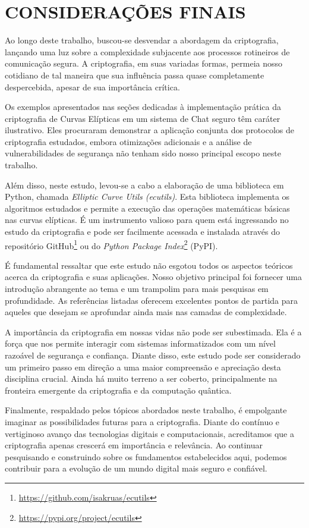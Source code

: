 \section{CONSIDERAÇÕES FINAIS}
Ao longo deste trabalho, buscou-se desvendar a abordagem da criptografia,
lançando uma luz sobre a complexidade subjacente aos processos rotineiros de
comunicação segura. A criptografia, em suas variadas formas, permeia nosso
cotidiano de tal maneira que sua influência passa quase completamente
despercebida, apesar de sua importância crítica.

Os exemplos apresentados nas seções dedicadas à implementação prática da
criptografia de Curvas Elípticas em um sistema de Chat seguro têm caráter
ilustrativo. Eles procuraram demonstrar a aplicação conjunta dos protocolos de
criptografia estudados, embora otimizações adicionais e a análise de
vulnerabilidades de segurança não tenham sido nosso principal escopo neste
trabalho.

Além disso, neste estudo, levou-se a cabo a elaboração de uma biblioteca em
Python, chamada \textit{Elliptic Curve Utils (ecutils)}. Esta biblioteca
implementa os algoritmos estudados e permite a execução das operações
matemáticas básicas nas curvas elípticas. É um instrumento valioso para quem
está ingressando no estudo da criptografia e pode ser facilmente acessada e
instalada através do repositório
GitHub\footnote{\url{https://github.com/isakruas/ecutils}} ou do \textit{Python
    Package Index}\footnote{\url{https://pypi.org/project/ecutils}} (PyPI).

É fundamental ressaltar que este estudo não esgotou todos os aspectos teóricos acerca
da criptografia e suas aplicações. Nosso objetivo principal foi fornecer uma introdução
abrangente ao tema e um trampolim para mais pesquisas em profundidade. As referências
listadas oferecem excelentes pontos de partida para aqueles que desejam se aprofundar
ainda mais nas camadas de complexidade.

A importância da criptografia em nossas vidas não pode ser subestimada. Ela é a
força que nos permite interagir com sistemas informatizados com um nível
razoável de segurança e confiança. Diante disso, este estudo pode ser
considerado um primeiro passo em direção a uma maior compreensão e apreciação
desta disciplina crucial. Ainda há muito terreno a ser coberto, principalmente
na fronteira emergente da criptografia e da computação quântica.

Finalmente, respaldado pelos tópicos abordados neste trabalho, é empolgante
imaginar as possibilidades futuras para a criptografia. Diante do contínuo e
vertiginoso avanço das tecnologias digitais e computacionais, acreditamos que a
criptografia apenas crescerá em importância e relevância. Ao continuar
pesquisando e construindo sobre os fundamentos estabelecidos aqui, podemos
contribuir para a evolução de um mundo digital mais seguro e confiável.
